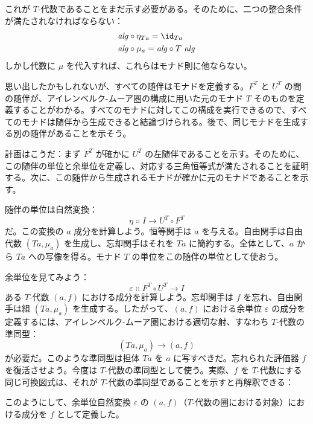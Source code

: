 これが $T$-代数であることをまだ示す必要がある。そのために、二つの整合条件が満たされなければならない：
\begin{align*}
  \mathit{alg} & \circ \eta_{Ta} = \id_{Ta}     \\
  \mathit{alg} & \circ \mu_a = \mathit{alg} \circ T\ \mathit{alg}
\end{align*}
しかし代数に $\mu$ を代入すれば、これらはモナド則に他ならない。

思い出したかもしれないが、すべての随伴はモナドを定義する。$F^T$ と $U^T$ の間の随伴が、アイレンベルク-ムーア圏の構成に用いた元のモナド $T$ そのものを定義することがわかる。すべてのモナドに対してこの構成を実行できるので、すべてのモナドは随伴から生成できると結論づけられる。後で、同じモナドを生成する別の随伴があることを示そう。

計画はこうだ：まず $F^T$ が確かに $U^T$ の左随伴であることを示す。そのために、この随伴の単位と余単位を定義し、対応する三角恒等式が満たされることを証明する。次に、この随伴から生成されるモナドが確かに元のモナドであることを示す。

随伴の単位は自然変換：
\[\eta \Colon I \to U^T \circ F^T\]
だ。この変換の $a$ 成分を計算しよう。恒等関手は $a$ を与える。自由関手は自由代数 $(T a, \mu_a)$ を生成し、忘却関手はそれを $T a$ に簡約する。全体として、$a$ から $T a$ への写像を得る。モナド $T$ の単位をこの随伴の単位として使おう。

余単位を見てみよう：
\[\varepsilon \Colon F^T \circ U^T \to I\]
ある $T$-代数 $(a, f)$ における成分を計算しよう。忘却関手は $f$ を忘れ、自由関手は組 $(T a, \mu_a)$ を生成する。したがって、$(a, f)$ における余単位 $\varepsilon$ の成分を定義するには、アイレンベルク-ムーア圏における適切な射、すなわち $T$-代数の準同型：
\[(T a, \mu_a) \to (a, f)\]
が必要だ。このような準同型は担体 $T a$ を $a$ に写すべきだ。忘れられた評価器 $f$ を復活させよう。今度は $T$-代数の準同型として使う。実際、$f$ を $T$-代数にする同じ可換図式は、それが $T$-代数の準同型であることを示すと再解釈できる：

\begin{figure}[H]
  \centering
\end{figure}

\noindent
このようにして、余単位自然変換 $\varepsilon$ の $(a, f)$（$T$-代数の圏における対象）における成分を $f$ として定義した。

